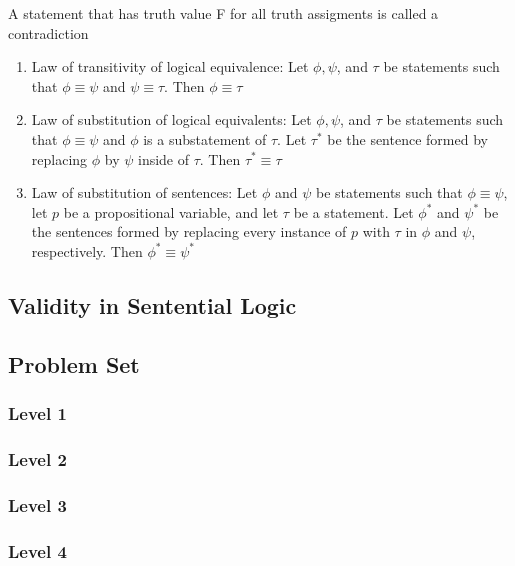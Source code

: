 \documentclass{article}
\begin{document}
\begin{definition}[Contradiction]
    A statement that has truth value F for all truth assigments is called
    a contradiction
\end{definition}

\begin{proposition}
    \begin{enumerate}
	\item Law of transitivity of logical equivalence: Let $\phi, \psi$,
	    and $\tau$ be statements such that $\phi \equiv \psi$ and
	    $\psi \equiv \tau$. Then $\phi \equiv \tau$
	\item Law of substitution of logical equivalents: Let $\phi, \psi$, and $\tau$ be statements such that $\phi \equiv \psi$ and $\phi$ is a substatement of $\tau$. Let $\tau^{*}$ be the sentence formed by replacing $\phi$ by $\psi$ inside of $\tau$. Then $\tau^{*} \equiv \tau$
	\item Law of substitution of sentences: Let $\phi$ and $\psi$ be statements such that $\phi \equiv \psi$, let $p$ be a propositional variable, and let $\tau$ be a statement. Let $\phi^{*}$ and $\psi^{*}$ be the sentences formed by replacing every instance of $p$ with $\tau$ in $\phi$ and $\psi$, respectively. Then $\phi^{*} \equiv \psi^{*}$
    \end{enumerate}
\end{proposition}

\subsection{Validity in Sentential Logic}
\subsection{Problem Set}
\subsubsection{Level 1}
\subsubsection{Level 2}
\subsubsection{Level 3}
\subsubsection{Level 4}
\end{document}
